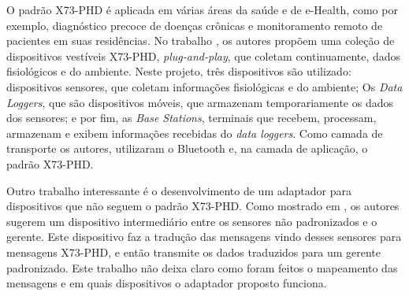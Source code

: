 O padrão X73-PHD é aplicada em várias áreas da saúde e de e-Health, como por exemplo, diagnóstico precoce de doenças crônicas e  monitoramento remoto de pacientes em suas residências. No trabalho \cite{b22}, os autores propõem uma coleção de dispositivos vestíveis X73-PHD, \textit{plug-and-play}, que coletam continuamente, dados fisiológicos e do ambiente. Neste projeto, três dispositivos são utilizado: dispositivos sensores, que coletam informações fisiológicas e do ambiente; Os \textit{Data Loggers}, que são dispositivos móveis, que armazenam temporariamente os dados dos sensores; e por fim, as \textit{Base Stations}, terminais que recebem, processam, armazenam e exibem informações recebidas do \textit{data loggers}. Como camada de transporte os autores, utilizaram o Bluetooth e, na camada de aplicação, o padrão X73-PHD.  

Outro trabalho interessante é o desenvolvimento de um adaptador para dispositivos que não seguem o padrão X73-PHD. Como mostrado em \cite{b23}, os autores sugerem um dispositivo intermediário entre os sensores não padronizados e o gerente. Este dispositivo faz a tradução das mensagens vindo desses sensores para mensagens X73-PHD, e então transmite os dados traduzidos para um gerente padronizado. Este trabalho não deixa claro como foram feitos o mapeamento das mensagens e em quais dispositivos o adaptador proposto funciona. 

